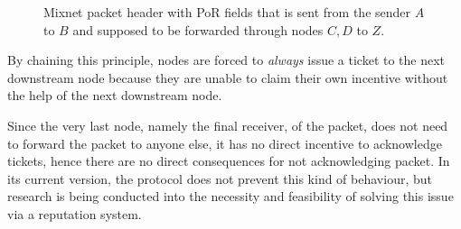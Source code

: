 \begin{figure}[H]
    \caption{Mixnet packet header with PoR fields that is sent from the sender $A$ to $B$ and supposed to be forwarded through nodes $C, D$ to $Z$.}
\end{figure}

By chaining this principle, nodes are forced to \textit{always} issue a ticket to the next downstream node because they are unable to claim their own incentive without the help of the next downstream node.

Since the very last node, namely the final receiver, of the packet, does not need to forward the packet to anyone else, it has no direct incentive to acknowledge tickets, hence there are no direct consequences for not acknowledging packet. In its current version, the protocol does not prevent this kind of behaviour, but research is being conducted into the necessity and feasibility of solving this issue via a reputation system.